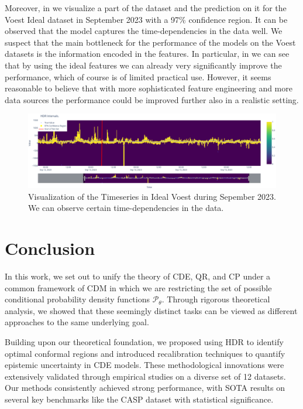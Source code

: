 Moreover, in  we visualize a part of the dataset and the prediction on it for the Voest Ideal dataset in September 2023 with a 97\% confidence region. It can be observed that the model captures the time-dependencies in the data well. We suspect that the main bottleneck for the performance of the models on the Voest datasets is the information encoded in the features. In particular, in  we can see that by using the ideal features we can already very significantly improve the performance, which of course is of limited practical use. However, it seems reasonable to believe that with more sophisticated feature engineering and more data sources the performance could be improved further also in a realistic setting.

\begin{figure}
    \centering
    \includegraphics[width=1\textwidth]{resources/voest_ideal_test_set.png}
    \caption[Visualization of the Timeseries in Ideal Voest]{Visualization of the Timeseries in Ideal Voest during Sepember 2023. We can observe certain time-dependencies in the data.}\label{fig:voest_ideal_test_set}
\end{figure}

\chapter{Conclusion}\label{chap:conclusion}

In this work, we set out to unify the theory of CDE, QR, and CP under a common framework of CDM in which we are restricting the set of possible conditional probability density functions $\mathscr{P}_\theta$. Through rigorous theoretical analysis, we showed that these seemingly distinct tasks can be viewed as different approaches to the same underlying goal.

Building upon our theoretical foundation, we proposed using HDR to identify optimal conformal regions and introduced recalibration techniques to quantify epistemic uncertainty in CDE models. These methodological innovations were extensively validated through empirical studies on a diverse set of 12 datasets. Our methods consistently achieved strong performance, with SOTA results on several key benchmarks like the CASP dataset with statistical significance.

